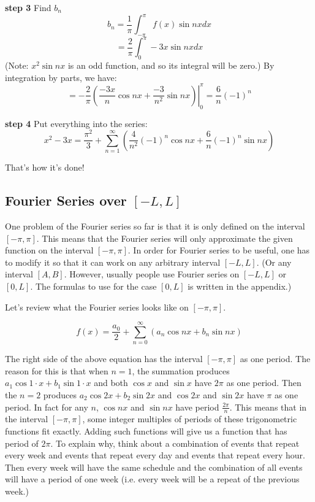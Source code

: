 \documentclass[12pt]{report}
\begin{document}
\textbf{step 3} Find $b_n$
$$b_n = \frac{1}{\pi} \int_{-\pi}^{\pi} f(x) \sin nx dx$$
$$ =\frac{2}{\pi} \int_{0}^{\pi} -3x \sin nx dx $$
(Note: $x^2 \sin nx$ is an odd function, and so its integral will be zero.)
By integration by parts, we have:
$$ =-\frac{2}{\pi} \left. \left(\frac{-3x}{n} \cos nx + \frac{-3}{n^2} \sin nx \right) \right\vert_{0}^{\pi} = \frac{6}{n} (-1)^n $$

\textbf{step 4} Put everything into the series:
$$x^2-3x = \frac{\pi^2}{3}+\sum_{n=1}^{\infty} \left( \frac{4}{n^2} (-1)^n \cos nx + \frac{6}{n} (-1)^n \sin nx \right) $$

That's how it's done!

\subsection*{Fourier Series over  $[-L, L]$ }

One problem of the Fourier series so far is that it is only defined on the interval $[-\pi, \pi]$. This means that the Fourier series will only approximate the given function on the interval $[-\pi, \pi]$. In order for Fourier series to be useful, one has to modify it so that it can work on any arbitrary interval $[-L, L]$. (Or any interval $[A,B]$. However, usually people use Fourier series on $[-L, L]$ or $[0,L]$. The formulas to use for the case $[0,L]$ is written in the appendix.)

Let's review what the Fourier series looks like on $[-\pi, \pi]$.

$$f(x) = \frac{a_0}{2} +\sum_{n=0}^{\infty} \left( a_n \cos nx + b_n \sin nx \right) $$

The right side of the above equation has the interval $[-\pi,\pi]$ as one period. The reason for this is that when $n=1$, the summation produces $a_1 \cos 1\cdot x + b_1 \sin 1\cdot x$ and both $\cos x$ and $\sin x$ have $2\pi$ as one period. Then the $n=2$ produces $a_2 \cos 2x + b_2 \sin 2x $ and $\cos 2x$ and $\sin 2x$ have $\pi$ as one period. In fact for any $n$,  $\cos nx$ and $\sin nx$ have period $\frac{2\pi}{n}$. This means that in the interval $[-\pi,\pi]$, some integer multiples of periods of these trigonometric functions fit exactly. Adding such functions will give us a function that has period of $2\pi$. To explain why, think about a combination of events that repeat every week and events that repeat every day and events that repeat every hour. Then every week will have the same schedule and the combination of all events will have a period of one week (i.e. every week will be a repeat of the previous week.)
\end{document}

